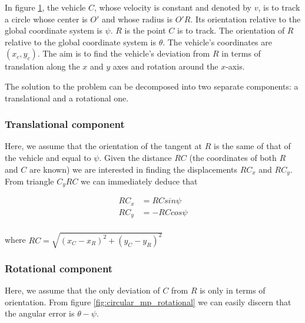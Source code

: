 In figure \ref{fig:circular_mpc}, the vehicle $C$, whose velocity is constant
and denoted by $v$, is to track a circle whose center is $O'$ and whose
radius is $O'R$. Its orientation relative to the global coordinate system is
$\psi$. $R$ is the point $C$ is to track. The orientation of $R$ relative to
the global coordinate system is $\theta$. The vehicle's coordinates are
$(x_c, y_c)$. The aim is to find the vehicle's deviation from $R$ in terms of
translation along the $x$ and $y$ axes and rotation around the $x$-axis.

\begin{figure}[H]\centering
  \scalebox{0.8}{}
  \caption{}
  \label{fig:circular_mpc}
\end{figure}

The solution to the problem can be decomposed into two separate components:
a translational and a rotational one.

\subsubsection{Translational component}

Here, we assume that the orientation of the tangent at $R$ is the same of that
of the vehicle and equal to $\psi$. Given the distance $RC$ (the coordinates of
both $R$ and $C$ are known) we are interested in finding the displacements
$RC_x$ and $RC_y$. From triangle $C_yRC$ we can immediately deduce that

\begin{align}
  RC_x &= RC sin\psi \\
  RC_y &= -RC cos\psi \\
\end{align}

where $RC = \sqrt{(x_C - x_R)^2 + (y_C - y_R)^2}$

\begin{figure}[H]\centering
  \scalebox{0.8}{}
  \caption{}
  \label{}
\end{figure}


\subsubsection{Rotational component}

Here, we assume that the only deviation of $C$ from $R$ is only in terms of
orientation. From figure \ref{fig:circular_mp_rotational} we can easily
discern that the angular error is $\theta -\psi$.

